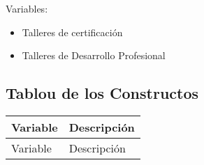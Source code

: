 Variables:
\begin{itemize}
	\item Talleres de certificación
	\item Talleres de Desarrollo Profesional	
\end{itemize} 

\subsection{Tablou de los Constructos}

\begin{longtable}{| p{4cm}| p{8cm} |}
	\hline
	Variable & Descripción \\
	\hline \hline
	\endfirsthead	
	\hline
	Variable & Descripción \\
	\hline \hline
	\endhead
		

\end{longtable}
